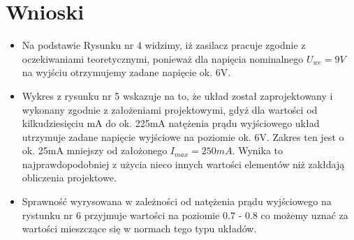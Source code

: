 \documentclass[a4paper,12pt]{article}
\begin{document}
\newpage
\section {Wnioski}

\begin{itemize}
  \item Na podstawie Rysunku nr 4 widzimy, iż zasilacz pracuje zgodnie z oczekiwaniami teoretycznymi, ponieważ dla 
	napięcia nominalnego $U_{we} = 9V$ na wyjściu otrzymujemy zadane napięcie ok. 6V.
  \item Wykres z rysunku nr 5 wskazuje na to, że układ został zaprojektowany i wykonany zgodnie z założeniami
	projektowymi, gdyż dla wartości od kilkudziesięciu mA do ok. 225mA natężenia prądu wyjściowego 
	układ utrzymuje zadane napięcie wyjściowe na poziomie ok. 6V. Zakres ten jest o ok. 25mA mniejszy
	od założonego $I_{max} = 250mA$. Wynika to najprawdopodobniej z użycia nieco innych wartości
	elementów niż zakłdają obliczenia projektowe.
  \item Sprawność wyrysowana w zależności od natężenia prądu wyjściowego na rystunku nr 6 przyjmuje 
	wartości na poziomie 0.7 - 0.8 co możemy uznać za wartości mieszczące się w normach tego typu układów.
\end{itemize}
\end{document}
